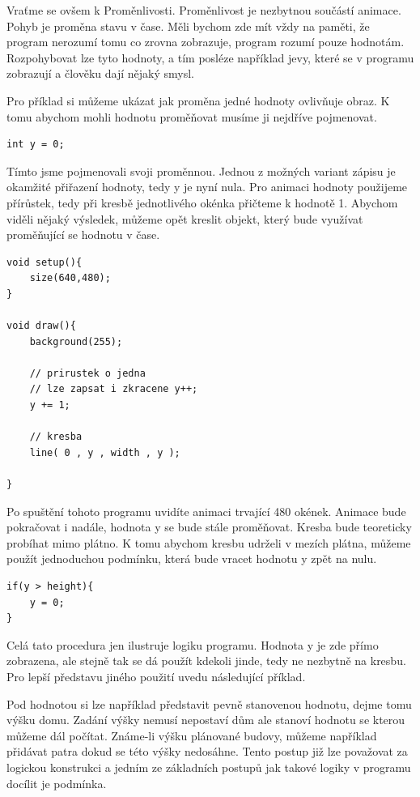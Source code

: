 \documentclass[11pt]{book}
\begin{document}
Vraťme se ovšem k Proměnlivosti. Proměnlivost je nezbytnou součástí animace. Pohyb je proměna stavu v čase. Měli bychom zde mít vždy na paměti, že program nerozumí tomu co zrovna zobrazuje, program rozumí pouze hodnotám. Rozpohybovat lze tyto hodnoty, a tím posléze například jevy, které se v programu zobrazují a člověku dají nějaký smysl. 

Pro příklad si můžeme ukázat jak proměna jedné hodnoty ovlivňuje obraz. K tomu abychom mohli hodnotu proměňovat musíme ji nejdříve pojmenovat.

\begin{lstlisting}
int y = 0;
\end{lstlisting}

Tímto jsme pojmenovali svoji proměnnou. Jednou z možných variant zápisu je okamžité přiřazení hodnoty, tedy y je nyní nula. Pro animaci hodnoty použijeme přírůstek, tedy při kresbě jednotlivého okénka přičteme k hodnotě 1. Abychom viděli nějaký výsledek, můžeme opět kreslit objekt, který bude využívat proměňující se hodnotu v čase.

\begin{lstlisting}
void setup(){
	size(640,480);
}

void draw(){
	background(255);
	
	// prirustek o jedna
	// lze zapsat i zkracene y++;
	y += 1;
	
	// kresba
	line( 0 , y , width , y );

}
\end{lstlisting}

Po spuštění tohoto programu uvidíte animaci trvající 480 okének. Animace bude pokračovat i nadále, hodnota y se bude stále proměňovat. Kresba bude teoreticky probíhat mimo plátno. K tomu abychom kresbu udrželi v mezích plátna, můžeme použít jednoduchou podmínku, která bude vracet hodnotu y zpět na nulu.


\begin{lstlisting}
if(y > height){
	y = 0;
}
\end{lstlisting}

Celá tato procedura jen ilustruje logiku programu. Hodnota y je zde přímo zobrazena, ale stejně tak se dá použít kdekoli jinde, tedy ne nezbytně na kresbu. Pro lepší představu jiného použití uvedu následující příklad.

Pod hodnotou si lze například představit pevně stanovenou hodnotu, dejme tomu výšku domu. Zadání výšky nemusí nepostaví dům ale stanoví hodnotu se kterou můžeme dál počítat. Známe-li výšku plánované budovy, můžeme například přidávat patra dokud se této výšky nedosáhne. Tento postup již lze považovat za logickou konstrukci a jedním ze základních postupů jak takové logiky v programu docílit je podmínka.
\end{document}
